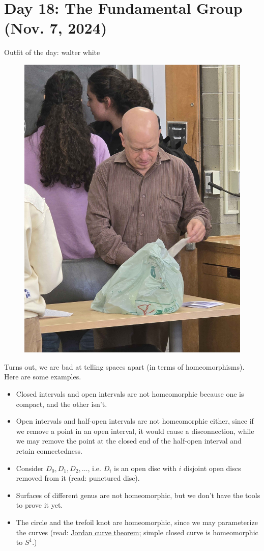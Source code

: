 \section{Day 18: The Fundamental Group (Nov. 7, 2024)}
Outfit of the day: walter white
\begin{figure}[h]
    \centering
    \includegraphics[scale=0.1]{MAT327 Notes/Dror Shirts/dror day 18 shirt.jpg}
\end{figure}

\noindent Turns out, we are bad at telling spaces apart (in terms of homeomorphisms). Here are some examples.
\begin{itemize}
    \item Closed intervals and open intervals are not homeomorphic because one is compact, and the other isn't.
    \item Open intervals and half-open intervals are not homeomorphic either, since if we remove a point in an open interval, it would cause a disconnection, while we may remove the point at the closed end of the half-open interval and retain connectedness.
    \item Consider $D_0, D_1, D_2, \dots$, i.e. $D_i$ is an open disc with $i$ disjoint open discs removed from it (read: punctured disc).
    \item Surfaces of different genus are not homeomorphic, but we don't have the tools to prove it yet.
    \item The circle and the trefoil knot are homeomorphic, since we may parameterize the curves (read: \href{https://en.wikipedia.org/wiki/Jordan_curve_theorem}{Jordan curve theorem}; simple closed curve is homeomorphic to $S^1$.)
\end{itemize}

